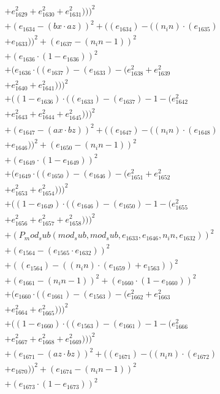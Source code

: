 \documentclass[10pt, a4paper]{article}
\begin{document}
\begin{small}
\begin{align*}
& + e_{1629}^{2} + e_{1630}^{2} + e_{1631}^{2})))^{2} \\
& + (e_{1634} - (bx  \cdot  az))^{2} + ((e_{1634}) - ((n_in)  \cdot  (e_{1635}) \\
& + e_{1633}))^{2} + (e_{1637} - (n_in - 1))^{2} \\
& + (e_{1636}  \cdot  (1 - e_{1636}))^{2} \\
& + (e_{1636}  \cdot  ((e_{1637}) - (e_{1633}) - (e_{1638}^{2} + e_{1639}^{2} \\
& + e_{1640}^{2} + e_{1641}^{2})))^{2} \\
& + ((1 - e_{1636})  \cdot  ((e_{1633}) - (e_{1637}) - 1 - (e_{1642}^{2} \\
& + e_{1643}^{2} + e_{1644}^{2} + e_{1645}^{2})))^{2} \\
& + (e_{1647} - (ax  \cdot  bz))^{2} + ((e_{1647}) - ((n_in)  \cdot  (e_{1648}) \\
& + e_{1646}))^{2} + (e_{1650} - (n_in - 1))^{2} \\
& + (e_{1649}  \cdot  (1 - e_{1649}))^{2} \\
& + (e_{1649}  \cdot  ((e_{1650}) - (e_{1646}) - (e_{1651}^{2} + e_{1652}^{2} \\
& + e_{1653}^{2} + e_{1654}^{2})))^{2} \\
& + ((1 - e_{1649})  \cdot  ((e_{1646}) - (e_{1650}) - 1 - (e_{1655}^{2} \\
& + e_{1656}^{2} + e_{1657}^{2} + e_{1658}^{2})))^{2} \\
& + (P_mod_sub(mod_sub, mod_sub, e_{1633}, e_{1646}, n_in, e_{1632}))^{2} \\
& + (e_{1564} - (e_{1565}  \cdot  e_{1632}))^{2} \\
& + ((e_{1564}) - ((n_in)  \cdot  (e_{1659}) + e_{1563}))^{2} \\
& + (e_{1661} - (n_in - 1))^{2} + (e_{1660}  \cdot  (1 - e_{1660}))^{2} \\
& + (e_{1660}  \cdot  ((e_{1661}) - (e_{1563}) - (e_{1662}^{2} + e_{1663}^{2} \\
& + e_{1664}^{2} + e_{1665}^{2})))^{2} \\
& + ((1 - e_{1660})  \cdot  ((e_{1563}) - (e_{1661}) - 1 - (e_{1666}^{2} \\
& + e_{1667}^{2} + e_{1668}^{2} + e_{1669}^{2})))^{2} \\
& + (e_{1671} - (az  \cdot  bz))^{2} + ((e_{1671}) - ((n_in)  \cdot  (e_{1672}) \\
& + e_{1670}))^{2} + (e_{1674} - (n_in - 1))^{2} \\
& + (e_{1673}  \cdot  (1 - e_{1673}))^{2} \\

\end{align*}
\end{small}
\end{document}
